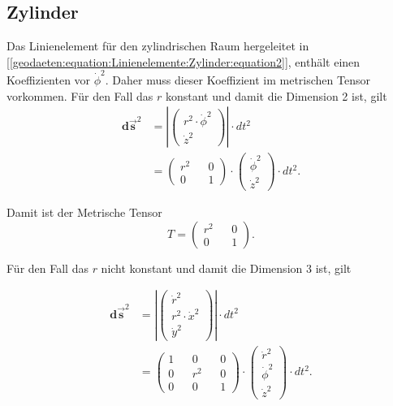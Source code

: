 %
%
%
%
\subsection{Zylinder\label{geodaeten:section:MetrischerTensor:Zylinder}}

Das Linienelement für den zylindrischen Raum hergeleitet in [\ref{geodaeten:equation:Linienelemente:Zylinder:equation2}], enthält einen Koeffizienten vor $\dot{\phi} ^2$.
Daher muss dieser Koeffizient im metrischen Tensor vorkommen.
Für den Fall das $r$ konstant und damit die Dimension 2 ist, gilt
\begin{equation}
	\begin{aligned}
	\mathbf{d\vec{s}}^2 &= \left| \begin{pmatrix} r^2 \cdot \dot{\phi}^2 \\ \dot{z}^2 \end{pmatrix} \right| \cdot dt^2 \\
	&= \begin{pmatrix} r^2 && 0 \\ 0 && 1 \end{pmatrix} \cdot \begin{pmatrix} \dot{\phi}^2 \\ \dot{z}^2 \end{pmatrix} \cdot dt^2 .
	\end{aligned}
\end{equation}

Damit ist der Metrische Tensor 
\begin{equation}
		T = \begin{pmatrix} r^2 && 0 \\ 0 && 1 \end{pmatrix} .
\end{equation}

Für den Fall das $r$ nicht konstant und damit die Dimension 3 ist, gilt

\begin{equation}
	\begin{aligned}
	\mathbf{d\vec{s}}^2 &= \left| \begin{pmatrix} \dot{r}^2 \\ r^2 \cdot \dot{x}^2 \\ \dot{y}^2 \end{pmatrix} \right| \cdot dt^2 \\
	&= \begin{pmatrix} 1 && 0 && 0 \\ 0 && r^2 && 0 \\ 0 && 0 && 1 \end{pmatrix} \cdot \begin{pmatrix} \dot{r}^2 \\ \dot{\phi}^2 \\ \dot{z}^2\end{pmatrix} \cdot dt^2 .
	\end{aligned}
\end{equation}

